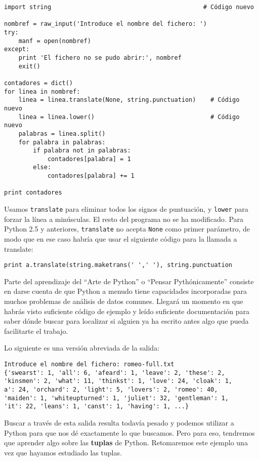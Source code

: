 \beforeverb
\begin{verbatim}
import string                                          # Código nuevo

nombref = raw_input('Introduce el nombre del fichero: ')
try:
    manf = open(nombref)
except:
    print 'El fichero no se pudo abrir:', nombref
    exit()

contadores = dict()
for linea in nombref:
    linea = linea.translate(None, string.punctuation)    # Código nuevo
    linea = linea.lower()                                # Código nuevo
    palabras = linea.split()
    for palabra in palabras:
        if palabra not in palabras:
            contadores[palabra] = 1
        else:
            contadores[palabra] += 1

print contadores
\end{verbatim}
\afterverb
%
Usamos {\tt translate} para eliminar todos los signos de puntuación, y {\tt lower} para
forzar la línea a minúsculas. El resto del programa no se ha modificado.
Para Python 2.5 y anteriores, {\tt translate} no
acepta {\tt None} como primer parámetro, de modo que en ese caso
habría que usar el siguiente código para la llamada a translate:

\beforeverb
\begin{verbatim}
print a.translate(string.maketrans(' ',' '), string.punctuation
\end{verbatim}
\afterverb
%
Parte del aprendizaje del ``Arte de Python'' o ``Pensar Pythónicamente''
consiste en darse cuenta de que Python
a menudo tiene capacidades incorporadas para muchos problemas de análisis
de datos comunes. Llegará un momento en que habrás visto suficiente código de ejemplo y leído
suficiente documentación para saber dónde buscar para localizar si alguien
ya ha escrito antes algo que pueda facilitarte el trabajo.

Lo siguiente es una versión abreviada de la salida:

\beforeverb
\begin{verbatim}
Introduce el nombre del fichero: romeo-full.txt
{'swearst': 1, 'all': 6, 'afeard': 1, 'leave': 2, 'these': 2, 
'kinsmen': 2, 'what': 11, 'thinkst': 1, 'love': 24, 'cloak': 1, 
a': 24, 'orchard': 2, 'light': 5, 'lovers': 2, 'romeo': 40, 
'maiden': 1, 'whiteupturned': 1, 'juliet': 32, 'gentleman': 1, 
'it': 22, 'leans': 1, 'canst': 1, 'having': 1, ...}
\end{verbatim}
\afterverb
%
Buscar a través de esta salida resulta todavía pesado y podemos utilizar
a \mbox{Python} para que nos dé exactamente lo que buscamos. Pero para eso,
tendremos que aprender algo sobre las {\bf tuplas} de Python.
Retomaremos este ejemplo una vez que hayamos estudiado las tuplas.

